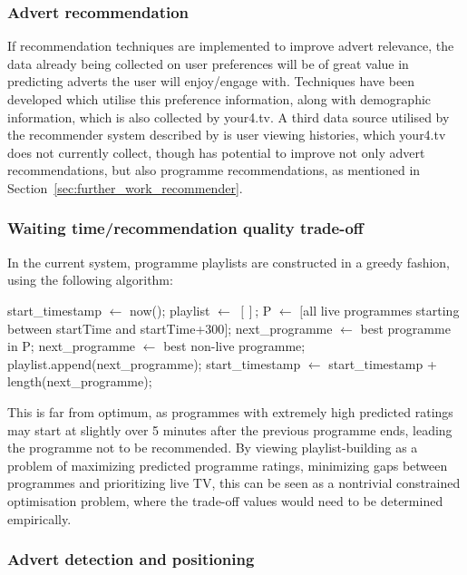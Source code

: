 	\subsubsection{Advert recommendation}

	If recommendation techniques are implemented to improve advert relevance, the data already being collected on user preferences will be of great value in predicting adverts the user will enjoy/engage with. Techniques have been developed \cite{contextual_advertising} which utilise this preference information, along with demographic \cite{contextual_advertising} information, which is also collected by your4.tv. A third data source utilised by the recommender system described by \cite{contextual_advertising} is user viewing histories, which your4.tv does not currently collect, though has potential to improve not only advert recommendations, but also programme recommendations, as mentioned in Section~\ref{sec:further_work_recommender}.

	\subsubsection{Waiting time/recommendation quality trade-off}
	In the current system, programme playlists are constructed in a greedy fashion, using the following algorithm:
	\begin{algorithmic}[H]
	\State start\_timestamp $\gets$ now();
	\State playlist $\gets$ $[]$;
		\State P $\gets$ $[$all live programmes starting between startTime and startTime+300$]$;
			\State next\_programme $\gets$ best programme in P;
		\Else
			\State next\_programme $\gets$ best non-live programme;
		\EndIf
		\State playlist.append(next\_programme);
		\State start\_timestamp $\gets$ start\_timestamp + length(next\_programme);
	\EndWhile
	\end{algorithmic}
	This is far from optimum, as programmes with extremely high predicted ratings may start at slightly over 5 minutes after the previous programme ends, leading the programme not to be recommended. By viewing playlist-building as a problem of maximizing predicted programme ratings, minimizing gaps between programmes and prioritizing live TV, this can be seen as a nontrivial constrained optimisation problem, where the trade-off values would need to be determined empirically.

	\subsubsection{Advert detection and positioning}

